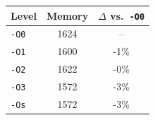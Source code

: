 \begin{tabular*}{\columnwidth}{@{\extracolsep\fill}lcc@{\extracolsep\fill}}
\toprule
\textbf{Level} & \textbf{Memory} & \textbf{$\Delta$ vs.\ \texttt{-O0}} \\
\midrule
\texttt{-O0} & 1624 & -- \\
\texttt{-O1} & 1600 & -1\% \\
\texttt{-O2} & 1622 & -0\% \\
\texttt{-O3} & 1572 & -3\% \\
\texttt{-Os} & 1572 & -3\% \\
\bottomrule
\end{tabular*}
